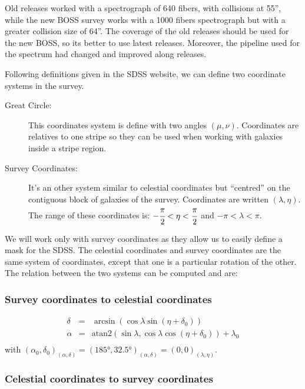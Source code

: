 Old releases worked with a spectrograph of 640 fibers, with collisions at
55'', while the new BOSS survey works with a 1000 fibers spectrograph but
with a greater collision size of 64''. The coverage of the old releases
should be used for the new BOSS, so its better to use latest releases.
Moreover, the pipeline used for the spectrum had changed and improved along
releases.

Following definitions given in the SDSS website, we can define two
coordinate systems in the survey.
%
\begin{description}
    \item[Great Circle:] This coordinates system is define with two angles
        $(\mu, \nu)$. Coordinates are relatives to one stripe so they can be
        used when working with galaxies inside a stripe region.

    \item[Survey Coordinates:] It's an other system similar to celestial
        coordinates but ``centred'' on the contiguous block of galaxies  of
        the survey. Coordinates are written $(\lambda, \eta)$. The range of
        these coordinates is: $-\cfrac{\pi}{2}<\eta<\cfrac{\pi}{2}$ and
        $-\pi<\lambda<\pi$.
\end{description}
%
We will work only with survey coordinates as they allow us to easily define
a mask for the SDSS\@. The celestial coordinates and survey coordinates are
the same system of coordinates, except that one is a particular rotation of
the other. The relation between the two systems can be computed and are:

\subsubsection{Survey coordinates to celestial coordinates}

\begin{eqnarray}
    \delta &=&
        \arcsin\left(\cos\lambda\sin\left(\eta+\delta_0\right)\right)
        \nonumber\\
    \alpha &=&
        \mathrm{atan2}
        \left(\sin\lambda,\cos\lambda\cos\left(\eta+\delta_0\right)\right)+
        \lambda_0\nonumber\\
\end{eqnarray}
%
with ${\left(\alpha_0,\delta_0\right)}_{\left(\alpha,\delta\right)}=
{\left(185°,32.5°\right)}_{\left(\alpha,\delta\right)}=
{\left(0,0\right)}_{\left(\lambda, \eta\right)}$.

\subsubsection{Celestial coordinates to survey coordinates}

